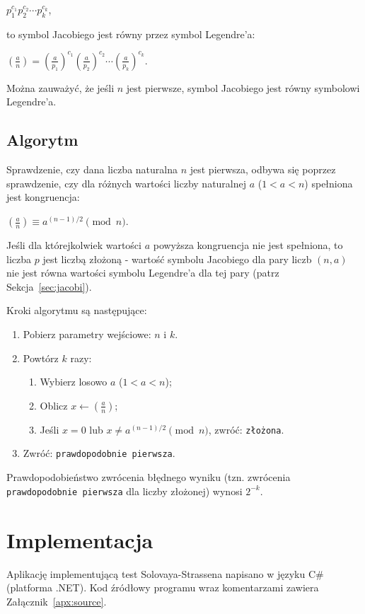 \documentclass[a4paper,10pt]{article}
\begin{document}
 $p_1^{c_1}p_2^{c_2}\cdots p_k^{c_k}$,
 
 to symbol Jacobiego jest równy przez symbol Legendre'a:
 
 $\left( \frac a n \right) = \left( \frac a {p_1} \right)^{c_1} \left( \frac a {p_2} \right)^{c_2} \cdots \left( \frac a {p_k} \right)^{c_k}$.

 Można zauważyć, że jeśli $n$ jest pierwsze, symbol Jacobiego jest równy symbolowi Legendre'a.
 
 
 \subsection{Algorytm}
 Sprawdzenie, czy dana liczba naturalna $n$ jest pierwsza, odbywa się poprzez sprawdzenie, czy dla różnych wartości liczby naturalnej $a$ ($1 < a < n$) spełniona jest kongruencja:
 
 $\left(\frac{a}{n}\right) \equiv a^{(n-1)/2} \pmod n$.
 
 Jeśli dla którejkolwiek wartości $a$ powyższa kongruencja nie jest spełniona, to liczba $p$ jest liczbą złożoną - wartość symbolu Jacobiego dla pary liczb $(n, a)$  nie jest równa wartości symbolu Legendre'a dla tej pary (patrz Sekcja~\ref{sec:jacobi}).
 
 Kroki algorytmu są następujące:
 
 \begin{enumerate}
  \item Pobierz parametry wejściowe: $n$ i $k$.
  \item Powtórz $k$ razy:
   \begin{enumerate}
    \item Wybierz losowo $a$ ($1 < a < n$);
    \item Oblicz $x \leftarrow \left(\frac{a}{n}\right)$;
    \item Jeśli $x = 0$ lub $x \ne a^{(n-1)/2} \pmod n$, zwróć: \verb+złożona+.
   \end{enumerate}
  \item Zwróć: \verb+prawdopodobnie pierwsza+.
 \end{enumerate}
 
 Prawdopodobieństwo zwrócenia błędnego wyniku (tzn. zwrócenia \verb+prawdopodobnie pierwsza+ dla liczby złożonej) wynosi $2^{-k}$.


\section{Implementacja}
Aplikację implementującą test Solovaya-Strassena napisano w języku C\# (platforma .NET).
Kod źródłowy programu wraz komentarzami zawiera Załącznik~\ref{apx:source}.
\end{document}
